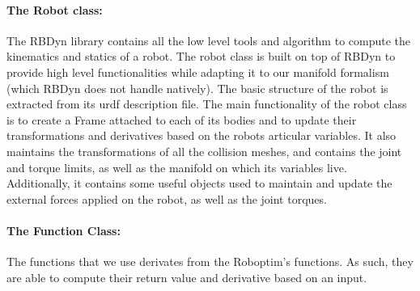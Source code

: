 \paragraph{The Robot class:}
The RBDyn library contains all the low level tools and algorithm to compute the kinematics and statics of a robot.
The robot class is built on top of RBDyn to provide high level functionalities while adapting it to our manifold formalism (which RBDyn does not handle natively).
The basic structure of the robot is extracted from its urdf description file.
The main functionality of the robot class is to create a Frame attached to each of its bodies and to update their transformations and derivatives based on the robots articular variables.
It also maintains the transformations of all the collision meshes, and contains the joint and torque limits, as well as the manifold on which its variables live.
Additionally, it contains some useful objects used to maintain and update the external forces applied on the robot, as well as the joint torques.

\paragraph{The Function Class:}
The functions that we use derivates from the Roboptim's functions.
As such, they are able to compute their return value and derivative based on an input.

